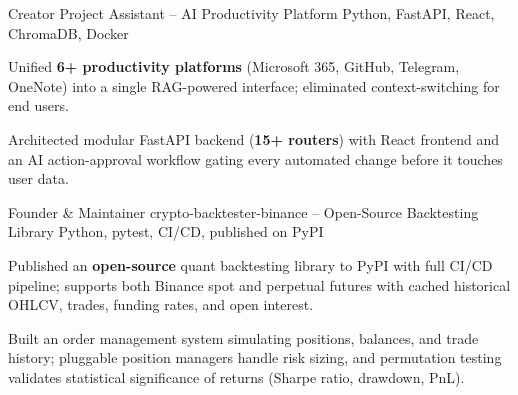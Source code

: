 

\begin{cventries}

  \cventry
    {Creator} %
    {Project Assistant -- AI Productivity Platform} %
    {Python, FastAPI, React, ChromaDB, Docker} %
    {} %
    {
      \begin{cvitems}
        \item {Unified \textbf{6+ productivity platforms} (Microsoft 365, GitHub, Telegram, OneNote) into a single RAG-powered interface; eliminated context-switching for end users.}
        \item {Architected modular FastAPI backend (\textbf{15+ routers}) with React frontend and an AI action-approval workflow gating every automated change before it touches user data.}
      \end{cvitems}
    }

  \cventry
    {Founder \& Maintainer} %
    {crypto-backtester-binance -- Open-Source Backtesting Library} %
    {Python, pytest, CI/CD, published on PyPI} %
    {} %
    {
      \begin{cvitems}
        \item {Published an \textbf{open-source} quant backtesting library to PyPI with full CI/CD pipeline; supports both Binance spot and perpetual futures with cached historical OHLCV, trades, funding rates, and open interest.}
        \item {Built an order management system simulating positions, balances, and trade history; pluggable position managers handle risk sizing, and permutation testing validates statistical significance of returns (Sharpe ratio, drawdown, PnL).}
      \end{cvitems}
    }

\end{cventries}
